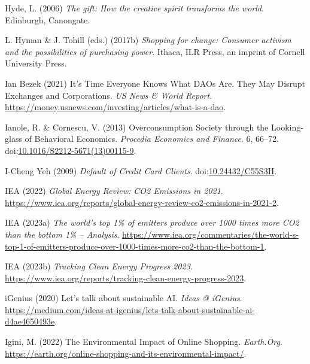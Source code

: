 \documentclass[
  letterpaper,
  DIV=11,
  numbers=noendperiod]{scrartcl}
\newlength{\cslhangindent}
\newenvironment{CSLReferences}[2] %
 {\begin{list}{}{%
  \setlength{\itemindent}{0pt}
  \setlength{\leftmargin}{0pt}
  \setlength{\parsep}{0pt}
  \ifodd #1
   \setlength{\leftmargin}{\cslhangindent}
   \setlength{\itemindent}{-1\cslhangindent}
  \fi
  \setlength{\itemsep}{#2\baselineskip}}}
 {\end{list}}
\begin{document}
\begin{CSLReferences}{0}{1}
Hyde, L. (2006) \emph{The gift: How the creative spirit transforms the
world}. Edinburgh, Canongate.

L. Hyman \& J. Tohill (eds.) (2017b) \emph{Shopping for change: Consumer
activism and the possibilities of purchasing power}. Ithaca, ILR Press,
an imprint of Cornell University Press.

Ian Bezek (2021) It's {Time Everyone Knows What DAOs Are}. {They May
Disrupt Exchanges} and {Corporations}. \emph{US News \& World Report}.
\url{https://money.usnews.com/investing/articles/what-is-a-dao}.

Ianole, R. \& Cornescu, V. (2013) Overconsumption {Society} through the
{Looking-glass} of {Behavioral Economics}. \emph{Procedia Economics and
Finance}. 6, 66--72.
doi:\href{https://doi.org/10.1016/S2212-5671(13)00115-9}{10.1016/S2212-5671(13)00115-9}.

I-Cheng Yeh (2009) \emph{Default of {Credit Card Clients}}.
doi:\href{https://doi.org/10.24432/C55S3H}{10.24432/C55S3H}.

IEA (2022) \emph{Global {Energy Review}: {CO2 Emissions} in 2021}.
\url{https://www.iea.org/reports/global-energy-review-co2-emissions-in-2021-2}.

IEA (2023a) \emph{The world's top 1\% of emitters produce over 1000
times more {CO2} than the bottom 1\% -- {Analysis}}.
\url{https://www.iea.org/commentaries/the-world-s-top-1-of-emitters-produce-over-1000-times-more-co2-than-the-bottom-1}.

IEA (2023b) \emph{Tracking {Clean Energy Progress} 2023}.
\url{https://www.iea.org/reports/tracking-clean-energy-progress-2023}.

iGenius (2020) Let's talk about sustainable {AI}. \emph{Ideas @
iGenius}.
\url{https://medium.com/ideas-at-igenius/lets-talk-about-sustainable-ai-d4ae4650493e}.

Igini, M. (2022) The {Environmental Impact} of {Online Shopping}.
\emph{Earth.Org}.
\url{https://earth.org/online-shopping-and-its-environmental-impact/}.


\end{CSLReferences}
\end{document}
